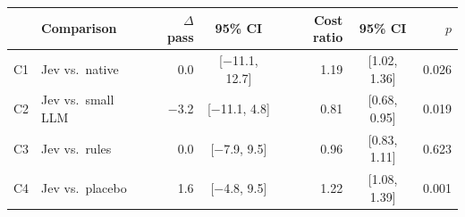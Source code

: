 \begin{tabular}{llrcrcr}
\toprule
& Comparison & $\Delta$ pass & 95\% CI & Cost ratio & 95\% CI & $p$ \\
\midrule
C1 & Jev vs.\ native & \num{+0.0} & [\num{-11.1}, \num{+12.7}] & 1.19 & [1.02, 1.36] & 0.026 \\
C2 & Jev vs.\ small LLM & \num{-3.2} & [\num{-11.1}, \num{+4.8}] & 0.81 & [0.68, 0.95] & 0.019 \\
C3 & Jev vs.\ rules & \num{+0.0} & [\num{-7.9}, \num{+9.5}] & 0.96 & [0.83, 1.11] & 0.623 \\
C4 & Jev vs.\ placebo & \num{+1.6} & [\num{-4.8}, \num{+9.5}] & 1.22 & [1.08, 1.39] & 0.001 \\
\bottomrule
\end{tabular}
